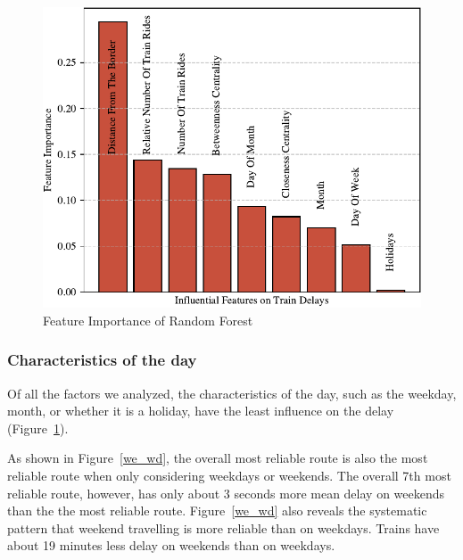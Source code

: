 \documentclass{article}
\theoremstyle{plain}
\theoremstyle{definition}
\theoremstyle{remark}
\begin{document}
\begin{figure}
    \centering
    \includegraphics[width=1\linewidth]{./fig/plot_JH_01_feature_importance.pdf}
    \caption{Feature Importance of Random Forest}
    \label{feature_importance}
\end{figure}

\subsubsection{Characteristics of the day}

Of all the factors we analyzed, the characteristics of the day,  such as the weekday, month, or whether it is a holiday, have the least influence on the delay (Figure~\ref{feature_importance}). 

As shown in Figure~\ref{we_wd}, the overall most reliable route is also the most reliable route when only considering weekdays or weekends. The overall 7th most reliable route, however, has only about 3 seconds more mean delay on weekends than the the most reliable route. Figure~\ref{we_wd} also reveals the systematic pattern that weekend travelling is more reliable than on weekdays. Trains have about 19 minutes less delay on weekends than on weekdays.
\end{document}

